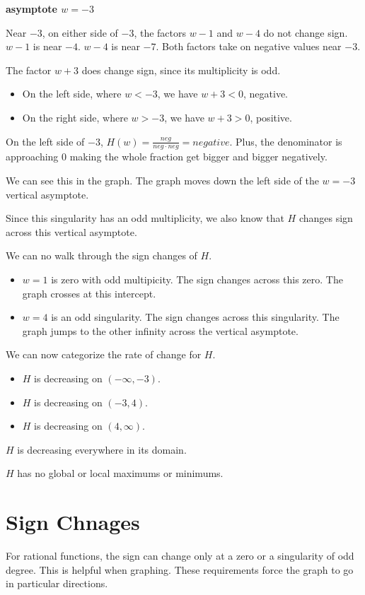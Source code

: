 \documentclass{ximera}
\begin{document}
\begin{example}
\textbf{asymptote $w = -3$}


Near $-3$, on either side of $-3$, the factors $w-1$ and $w-4$ do not change sign. $w-1$ is near $-4$.  $w-4$ is near $-7$.  Both factors take on negative values near $-3$.

The factor $w+3$ does change sign, since its multiplicity is odd.

\begin{itemize}
\item On the left side, where $w < -3$, we have $w+3<0$, negative.
\item On the right side, where $w > -3$, we have $w+3>0$, positive.
\end{itemize}


On the left side of $-3$, $H(w) = \frac{neg}{neg \cdot neg} = negative$.  Plus, the denominator is approaching $0$ making the whole fraction get bigger and bigger negatively.

We can see this in the graph.  The graph moves down the left side of the $w=-3$ vertical asymptote.

Since this singularity has an odd multiplicity, we also know that $H$ changes sign across this vertical asymptote.


We can no walk through the sign changes of $H$.

\begin{itemize}
\item $w = 1$ is zero with odd multipicity.  The sign changes across this zero. The graph crosses at this intercept.
\item $w = 4$ is an odd singularity. The sign changes across this singularity.  The graph jumps to the other infinity across the vertical asymptote.
\end{itemize}



We can now categorize the rate of change for $H$.

\begin{itemize}
\item $H$ is decreasing on $(-\infty, -3)$.
\item $H$ is decreasing on $(-3, 4)$.
\item $H$ is decreasing on $(4,\infty)$.
\end{itemize}

$H$ is decreasing everywhere in its domain.





$H$ has no global or local maximums or minimums.







\end{example}







\section{Sign Chnages}

For rational functions, the sign can change only at a zero or a singularity of odd degree. This is helpful when graphing. These requirements force the graph to go in particular directions.
\end{document}
